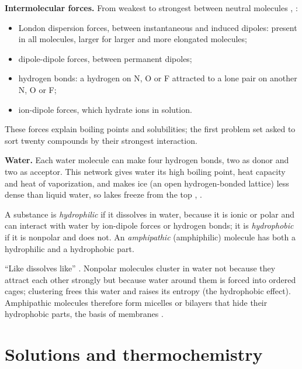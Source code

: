 \textbf{Intermolecular forces.}
From weakest to strongest between neutral
molecules \cite[Section
2-10]{wade2013organic}, \cite[Chapter
12]{kotz2012chemistry}:
\begin{itemize}
\item London dispersion forces, between
instantaneous and induced dipoles: present in
all molecules, larger for larger and more
elongated molecules;
\item dipole-dipole forces, between permanent
dipoles;
\item hydrogen bonds: a hydrogen on N, O or F
attracted to a lone pair on another N, O or
F;
\item ion-dipole forces, which hydrate ions
in solution.
\end{itemize}
These forces explain boiling points and
solubilities; the first problem set asked to
sort twenty compounds by their strongest
interaction.

\textbf{Water.}
Each water molecule can make four hydrogen
bonds, two as donor and two as acceptor. This
network gives water its high boiling point,
heat capacity and heat of vaporization, and
makes ice (an open hydrogen-bonded lattice)
less dense than liquid water, so lakes freeze
from the top \cite[Chapter
12]{kotz2012chemistry}, \cite[Chapter
2]{voet2013fundamentals}.

\begin{definition}
\label{definition-chem-hydrophilic}
A substance is \emph{hydrophilic} if it
dissolves in water, because it is ionic or
polar and can interact with water by
ion-dipole forces or hydrogen bonds; it is
\emph{hydrophobic} if it is nonpolar and does
not. An \emph{amphipathic} (amphiphilic)
molecule has both a hydrophilic and a
hydrophobic part.
\end{definition}

``Like dissolves like'' \cite[Section
2-11]{wade2013organic}. Nonpolar molecules
cluster in water not because they attract
each other strongly but because water around
them is forced into ordered cages; clustering
frees this water and raises its entropy (the
hydrophobic effect). Amphipathic molecules
therefore form micelles or bilayers that hide
their hydrophobic parts, the basis of
membranes \cite[Chapter
2]{voet2013fundamentals}.

\section{Solutions and thermochemistry}
\label{section-chem-thermochemistry}

